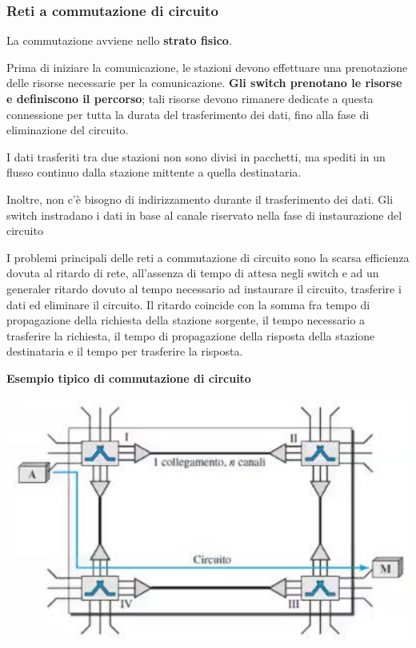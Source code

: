         \subsubsection{Reti a commutazione di circuito}
                    
            La commutazione avviene nello \textbf{strato fisico}.
                
            Prima di iniziare la comunicazione, le stazioni devono effettuare una prenotazione delle risorse necessarie per la comunicazione. \textbf{Gli switch prenotano le risorse e definiscono il percorso}; tali risorse devono rimanere dedicate a questa connessione per tutta la durata del trasferimento dei dati, fino alla fase di eliminazione del circuito.
                
            \vspace{3mm}    
            
            I dati trasferiti tra due stazioni non sono divisi in pacchetti, ma spediti in un flusso continuo dalla stazione mittente a quella destinataria.
                
            Inoltre, non c'è bisogno di indirizzamento durante il trasferimento dei dati. Gli switch instradano i dati in base al canale riservato nella fase di instaurazione del circuito

            \vspace{3mm}
            
            I problemi principali delle reti a commutazione di circuito sono la scarsa efficienza dovuta al ritardo di rete, all'assenza di tempo di attesa negli switch e ad un generaler ritardo dovuto al tempo necessario ad instaurare il circuito, trasferire i dati ed eliminare il circuito. Il ritardo coincide con la somma fra tempo di propagazione della richiesta della stazione sorgente, il tempo necessario a trasferire la richiesta, il tempo di propagazione della risposta della stazione destinataria e il tempo per trasferire la risposta.

            \vspace{3mm}

            \textbf{Esempio tipico di commutazione di circuito}
                
            \begin{center}
                \includegraphics[scale=0.75]{images/Circuito_Fase1.png}
            \end{center}
                

